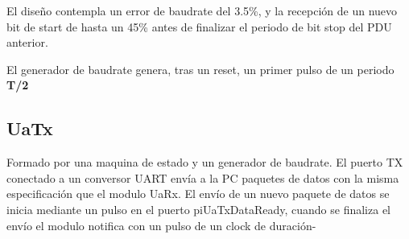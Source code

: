 \documentclass[12pt]{article}
\begin{document}
El diseño contempla un error de baudrate del 3.5\%, y la recepción de un nuevo bit de start de hasta un 45\% antes de finalizar el periodo de bit stop del PDU anterior.

El generador de baudrate genera, tras un reset, un primer pulso de un periodo \textbf{T/2}

\subsection{UaTx}
Formado por una maquina de estado y un generador de baudrate. El puerto TX conectado  a un conversor UART envía a la PC paquetes de datos con la misma especificación que el modulo UaRx. El envío de un nuevo paquete de datos se inicia mediante un pulso en el puerto piUaTxDataReady, cuando se finaliza el envío el modulo notifica con un pulso de un clock de duración-
\end{document}
